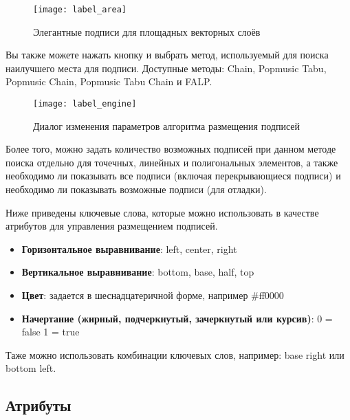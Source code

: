 \begin{figure}[ht]
\centering
   \texttt{[image: label\_area]}
   \caption{Элегантные подписи для площадных векторных слоёв \wincaption}\label{fig:arealabel}
\end{figure}


Вы также можете нажать кнопку  и выбрать метод,
используемый для поиска наилучшего места для подписи. Доступные методы:
Chain, Popmusic Tabu, Popmusic Chain, Popmusic Tabu Chain и FALP.

\begin{figure}[ht]
\centering
   \texttt{[image: label\_engine]}
   \caption{Диалог изменения параметров алгоритма размещения подписей \wincaption}\label{fig:labelengine}
\end{figure}

Более того, можно задать количество возможных подписей при данном методе
поиска отдельно для точечных, линейных и полигональных элементов, а также
необходимо ли показывать все подписи (включая перекрывающиеся подписи) и
необходимо ли показывать возможные подписи (для отладки).


Ниже приведены ключевые слова, которые можно использовать в качестве атрибутов
для управления размещением подписей.

\begin{itemize}[label=--]
\item \textbf{Горизонтальное выравнивание}: left, center, right
\item \textbf{Вертикальное выравнивание}: bottom, base, half, top
\item \textbf{Цвет}: задается в шеснадцатеричной форме, например \#ff0000
\item \textbf{Начертание (жирный, подчеркнутый, зачеркнутый или курсив)}: 0 = false 1 = true
\end{itemize}

Таже можно использовать комбинации ключевых слов, например: base right
или bottom left.

\subsection{Атрибуты}\label{label_attributes}

